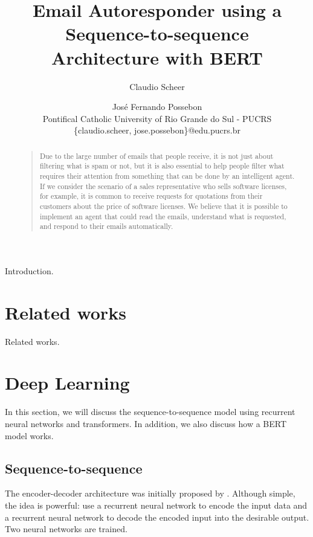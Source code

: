 \documentclass[letterpaper]{article}
\begin{document}
%
\title{Email Autoresponder using a Sequence-to-sequence\\Architecture with BERT}
\author{Claudio Scheer \and Jos\'e Fernando Possebon\\
    Pontifical Catholic University of Rio Grande do Sul - PUCRS\\
    \{claudio.scheer, jose.possebon\}@edu.pucrs.br
}

\maketitle

\begin{abstract}
    \begin{quote}
        Due to the large number of emails that people receive, it is not just about filtering what is spam or not, but it is also essential to help people filter what requires their attention from something that can be done by an intelligent agent. If we consider the scenario of a sales representative who sells software licenses, for example, it is common to receive requests for quotations from their customers about the price of software licenses. We believe that it is possible to implement an agent that could read the emails, understand what is requested, and respond to their emails automatically.
    \end{quote}
\end{abstract}

\noindent Introduction.


\section{Related works}
Related works.


\section{Deep Learning}

In this section, we will discuss the sequence-to-sequence model using recurrent neural networks and transformers. In addition, we also discuss how a BERT model works.

\subsection{Sequence-to-sequence}

The encoder-decoder architecture was initially proposed by \cite{DBLP:journals/corr/ChoMGBSB14}. Although simple, the idea is powerful: use a recurrent neural network to encode the input data and a recurrent neural network to decode the encoded input into the desirable output. Two neural networks are trained.
\end{document}
